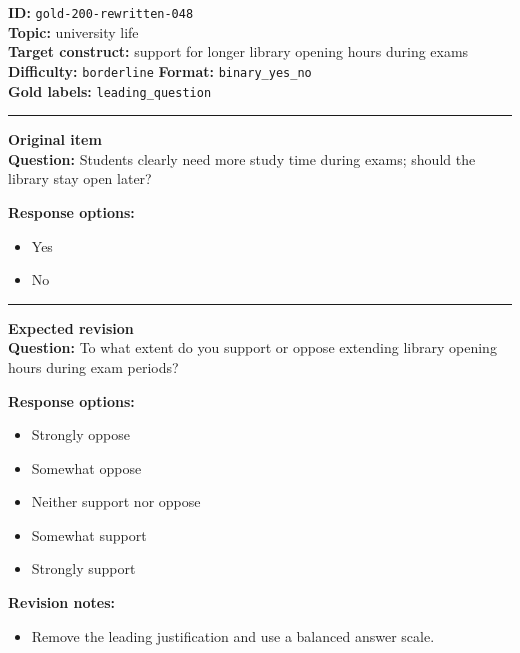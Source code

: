 \documentclass[10pt,a4paper]{article}
\newcommand{\sectionline}{\vspace{0.15em}\hrule\vspace{0.35em}}
\begin{document}
\begin{tcolorbox}[colframe=FlawRed,colback=white,colbacktitle=FlawRed!9,coltitle=black,title={Item 048\hfill Flawed item}]
\textbf{ID:} \texttt{gold-200-rewritten-048}\\
\textbf{Topic:} university life\\
\textbf{Target construct:} support for longer library opening hours during exams\\
\textbf{Difficulty:} \texttt{borderline} \quad \textbf{Format:} \texttt{binary\_yes\_no}\\
\textbf{Gold labels:} \texttt{leading\_question}\\
\sectionline
\textbf{Original item}\\
\textbf{Question:} Students clearly need more study time during exams; should the library stay open later?
\par\textbf{Response options:}
\begin{itemize}
\item Yes
\item No
\end{itemize}
\sectionline
\textbf{Expected revision}\\
\textbf{Question:} To what extent do you support or oppose extending library opening hours during exam periods?
\par\textbf{Response options:}
\begin{itemize}
\item Strongly oppose
\item Somewhat oppose
\item Neither support nor oppose
\item Somewhat support
\item Strongly support
\end{itemize}
\par\textbf{Revision notes:}
\begin{itemize}
\item Remove the leading justification and use a balanced answer scale.
\end{itemize}
\end{tcolorbox}
\end{document}
